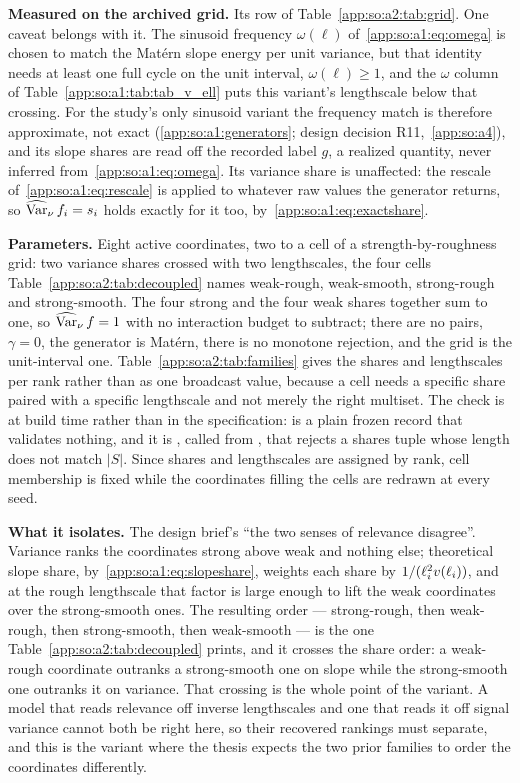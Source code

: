 \textbf{Measured on the archived grid.} Its row of
Table~\ref{app:so:a2:tab:grid}. One caveat belongs with it. The sinusoid
frequency $\omega(\ell)$ of~\eqref{app:so:a1:eq:omega} is chosen to match the
Mat\'ern slope energy per unit variance, but that identity needs at least one
full cycle on the unit interval, $\omega(\ell)\ge1$, and the $\omega$ column of
Table~\ref{app:so:a1:tab:tab_v_ell} puts this variant's lengthscale below that
crossing. For the study's only sinusoid variant the frequency match is
therefore approximate, not exact (\ref{app:so:a1:generators}; design decision
R11,~\ref{app:so:a4}), and its slope shares are read off the recorded label
$g$, a realized quantity, never inferred from~\eqref{app:so:a1:eq:omega}. Its
variance share is unaffected: the rescale of~\eqref{app:so:a1:eq:rescale} is
applied to whatever raw values the generator returns, so $\operatorname{\widehat{\mathrm{Var}}}_\nu f_i=s_i$
holds exactly for it too, by~\eqref{app:so:a1:eq:exactshare}.

\label{app:so:a2:decoupled}

\textbf{Parameters.} Eight active coordinates, two to a cell of a
strength-by-roughness grid: two variance shares crossed with two lengthscales,
the four cells Table~\ref{app:so:a2:tab:decoupled} names weak-rough,
weak-smooth, strong-rough and strong-smooth. The four strong and the four weak
shares together sum to one, so $\operatorname{\widehat{\mathrm{Var}}}_\nu f=1$ with no interaction budget to
subtract; there are no pairs, $\gamma=0$, the generator is Mat\'ern, there is no
monotone rejection, and the grid is the unit-interval one.
Table~\ref{app:so:a2:tab:families} gives the shares and lengthscales per rank
rather than as one broadcast value, because a cell needs a specific share paired
with a specific lengthscale and not merely the right multiset. The check is at
build time rather than in the specification:  is a plain
frozen record that validates nothing, and it is
, called from , that rejects a
shares tuple whose length does not match $|S|$. Since shares and lengthscales are assigned by rank, cell membership
is fixed while the coordinates filling the cells are redrawn at every seed.

\textbf{What it isolates.} The design brief's ``the two senses of relevance
disagree''. Variance ranks the coordinates strong above weak and nothing else;
theoretical slope share, by~\eqref{app:so:a1:eq:slopeshare}, weights each share
by $1/(\ell_i^2v(\ell_i))$, and at the rough lengthscale that factor is
large enough to lift the weak coordinates over the strong-smooth ones. The
resulting order --- strong-rough, then weak-rough, then strong-smooth, then
weak-smooth --- is the one Table~\ref{app:so:a2:tab:decoupled} prints, and it
crosses the share order: a weak-rough coordinate outranks a strong-smooth one on
slope while the strong-smooth one outranks it on variance. That crossing is the
whole point of the variant. A model that reads relevance off inverse
lengthscales and one that reads it off signal variance cannot both be right
here, so their recovered rankings must separate, and this is the variant where
the thesis expects the two prior families to order the coordinates differently.

